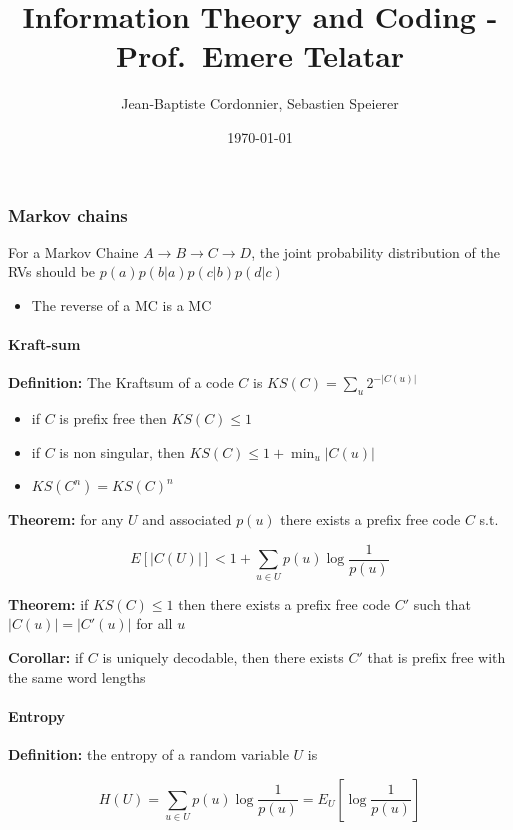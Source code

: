 \documentclass{article}
\title{Information Theory and Coding - Prof.~Emere Telatar}
\date{\today}
\author{Jean-Baptiste Cordonnier, Sebastien Speierer}
\begin{document}
\maketitle

\subsubsection{Markov chains}\label{markov-chains}

For a Markov Chaine $A \to B \to C \to D$, the joint probability
distribution of the RVs should be $p(a)p(b|a)p(c|b)p(d|c)$

\begin{itemize}
\item
  The reverse of a MC is a MC
\end{itemize}

\paragraph{Kraft-sum}\label{kraft-sum}

\textbf{Definition:} The Kraftsum of a code $C$ is
$KS(C) = \sum_u 2^{-|C(u)|}$

\begin{itemize}
\item
  if $C$ is prefix free then $KS(C) \leq 1$
\item
  if $C​$ is non singular, then $KS(C) \leq 1 + \min_u |C(u)|​$
\item
  $KS(C^n) = KS(C)^n$
\end{itemize}

\textbf{Theorem:} for any $U$ and associated $p(u)$ there exists a
prefix free code $C$ s.t.

\[E[|C(U)|] < 1 + \sum_{u\in U} p(u) \log \frac 1 {p(u)}\]

\textbf{Theorem:} if $KS(C)\leq 1$ then there exists a prefix free
code $C'$ such that $|C(u)| = |C'(u)|$ for all $u$

\textbf{Corollar:} if $C$ is uniquely decodable, then there exists
$C'$ that is prefix free with the same word lengths

\paragraph{Entropy}\label{entropy}

\textbf{Definition:} the entropy of a random variable $U$ is

\[H(U) = \sum_{u\in U} p(u) \log \frac 1 {p(u)} = E_U\left[\log \frac 1 {p(u)}\right]\]
\end{document}
